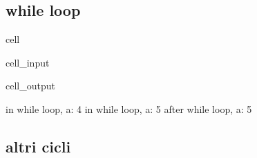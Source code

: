 \documentclass[letterpaper,10pt,italian]{jupyterBook}
\begin{document}
\subsection{while loop}
\label{\detokenize{ch/programming/flow_control:while-loop}}
\begin{sphinxuseclass}{cell}\begin{sphinxVerbatimInput}

\begin{sphinxuseclass}{cell_input}
\begin{sphinxVerbatim}[commandchars=\\\{\}]

  

     
      

\end{sphinxVerbatim}

\end{sphinxuseclass}\end{sphinxVerbatimInput}
\begin{sphinxVerbatimOutput}

\begin{sphinxuseclass}{cell_output}
\begin{sphinxVerbatim}[commandchars=\\\{\}]
\PYGZgt{}\PYGZgt{} in while loop, a: 4
\PYGZgt{}\PYGZgt{} in while loop, a: 5
after while loop, a: 5
\end{sphinxVerbatim}

\end{sphinxuseclass}\end{sphinxVerbatimOutput}

\end{sphinxuseclass}

\subsection{altri cicli}
\label{\detokenize{ch/programming/flow_control:altri-cicli}}
\sphinxAtStartPar
{}
\end{document}
